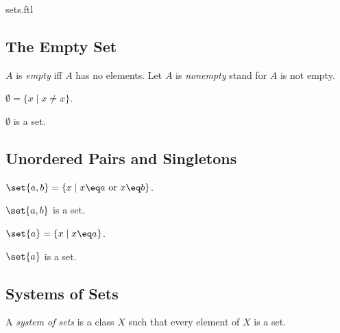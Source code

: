 \documentclass{naproche-library}
\begin{document}
\begin{smodule}{sets.ftl}
\subsection{The Empty Set}

\begin{definition*}[forthel,id=EmptyDef,printid]
  $A$ is \emph{empty} iff $A$ has no elements.
  Let $A$ is \emph{nonempty} stand for $A$ is not empty.
\end{definition*}

\begin{definition*}[forthel,id=EmptySetDef,printid]
  $\emptyset=\{x\mid x\neq x\}$.
\end{definition*}

\begin{axiom*}[forthel,title=Empty Set Axiom,id=EmptySetAx,printid]
  $\emptyset$ is a set.
\end{axiom*}


\subsection{Unordered Pairs and Singletons}

\begin{definition*}[forthel,id=UnorderedPairDef,printid]
  $\set{a,b}=\{x\mid x\eq a\text{ or }x\eq b\}$.
\end{definition*}

\begin{axiom*}[forthel,title=Pairing Axiom,id=UnorderedPairAx,printid]
  $\set{a,b}$ is a set.
\end{axiom*}

\begin{definition*}[forthel,id=SingletonDef,printid]
  $\set{a}=\{x\mid x\eq a\}$.
\end{definition*}

\begin{proposition*}[forthel,id=SingletonProp,printid]
  $\set{a}$ is a set.
\end{proposition*}


\subsection{Systems of Sets}

\begin{definition*}[forthel,id=SystemOfSetsDef,printid]
  A \emph{system of sets} is a class $X$ such that every element of $X$ is a set.
\end{definition*}


\end{smodule}
\end{document}
